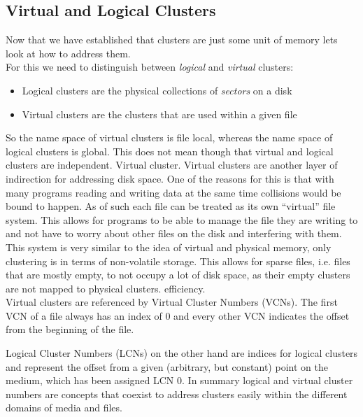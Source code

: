 \subsection{Virtual and Logical Clusters}
\label{sec:Cluster:CN}
Now that we have established that clusters are just some unit of memory lets look at how to address them. \\
For this we need to distinguish between \textit{logical} and \textit{virtual} clusters:
\begin{itemize}
	\item Logical clusters are the physical collections of \textit{sectors} on a disk 
	\item Virtual clusters are the clusters that are used within a given file
\end{itemize}
So the name space of virtual clusters is file local, whereas the name space of logical clusters is global. This does not mean though that virtual and logical clusters are independent. Virtual cluster. Virtual clusters are another layer of indirection for addressing disk space.
One of the reasons for this is that with many programs reading and writing data at the same time collisions would be bound to happen. As of such each file can be treated as its own ``virtual'' file system. This allows for programs to be able to manage the file they are writing to and not have to worry about other files on the disk and interfering with them. This system is very similar to the idea of virtual and physical memory, only clustering is in terms of non-volatile storage.
This allows for sparse files, i.e. files that are mostly empty, to not occupy a lot of disk space, as their empty clusters are not mapped to physical clusters. efficiency.\cite{RUSSINOVICH_ET_AL:2012:WI}\\
Virtual clusters are referenced by Virtual Cluster Numbers (VCNs). The first VCN of a file always has an index of $0$ and every other VCN indicates the offset from the beginning of the file. 

Logical Cluster Numbers (LCNs) on the other hand are indices for logical clusters and represent the offset from a given (arbitrary, but constant) point on the medium, which has been assigned LCN $0$.\cite{RUSSINOVICH_ET_AL:2012:WI}
In summary logical and virtual cluster numbers are concepts that coexist to address clusters easily within the different domains of media and files.